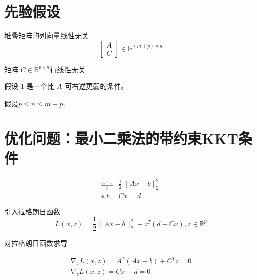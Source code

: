 \section{先验假设}

\begin{proposition}
    \label{prop:assumption-1}

    堆叠矩阵的列向量线性无关
\begin{equation}
\left[\begin{array}{l}
A \\
C
\end{array}\right] \in \mathbb{R}^{(m+p) \times n}
\end{equation}
\end{proposition}

\begin{proposition}
    \label{prop:assumption-2}
    矩阵 $ C \in \mathbb{R}^{p \times n} $行线性无关

\end{proposition}

假设 1 是一个比 $ A $ 可右逆更弱的条件。 

假设$ p \leq n \leq m+p $.

\section{优化问题：最小二乘法的带约束KKT条件}

\begin{problem}
    \begin{equation}\begin{aligned}
        \min _{x} & \frac{1}{2}\|A x-b\|_{2}^{2}\\
        s.t. & C x=d
    \end{aligned}\end{equation}
\end{problem}


引入拉格朗日函数
\begin{equation}
L(x, z)=\frac{1}{2}\|A x-b\|_{2}^{2}-z^{T}(d-C x), z \in \mathbb{R}^{p}
\end{equation}

对拉格朗日函数求导


\begin{equation}
    \label{eqn:kkt-deriavative}
    \begin{array}{l}
\nabla_{x} L(x, z)=A^{T}(A x-b)+C^{T} z=0 \\
\nabla_{z} L(x, z)=C x-d=0
\end{array}
\end{equation}



